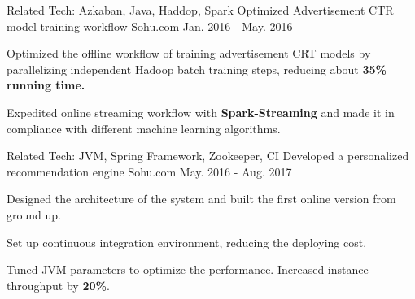\begin{cventries}
  \cventrynew
    {Related Tech: Azkaban, Java, Haddop, Spark} %
    {Optimized Advertisement CTR model training workflow} %
    {Sohu.com} %
    {Jan. 2016 - May. 2016} %
    {
      \begin{cvitems} %
        \item {Optimized the offline workflow of training advertisement CRT models by parallelizing independent Hadoop batch training steps, reducing about \textbf{35\% running time.}}
        \item {Expedited online streaming workflow with \textbf{Spark-Streaming} and made it in compliance with different machine learning algorithms.}
      \end{cvitems}
    }


  \cventrynew
    {Related Tech: JVM, Spring Framework, Zookeeper, CI} %
    {Developed a personalized recommendation engine} %
    {Sohu.com} %
    {May. 2016 - Aug. 2017} %
    {
      \begin{cvitems} %
        \item {Designed the architecture of the system and built the first online version from ground up.}
        \item {Set up continuous integration environment, reducing the deploying cost.}
        \item {Tuned JVM parameters to optimize the performance. Increased instance throughput by \textbf{20\%}.}
      \end{cvitems}
    } 
\end{cventries}

